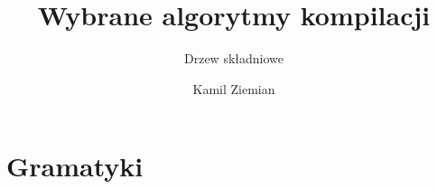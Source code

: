 \documentclass[10pt,t]{beamer}
\title{Wybrane algorytmy kompilacji}
\subtitle{Drzew składniowe}
\author{Kamil Ziemian \\
  \email}
\begin{document}





\RaggedRight





\maketitle


















\section{Gramatyki}

\label{sec:Podstawy-budowy-procesora-i-jezyka-asemblera}
\end{document}

